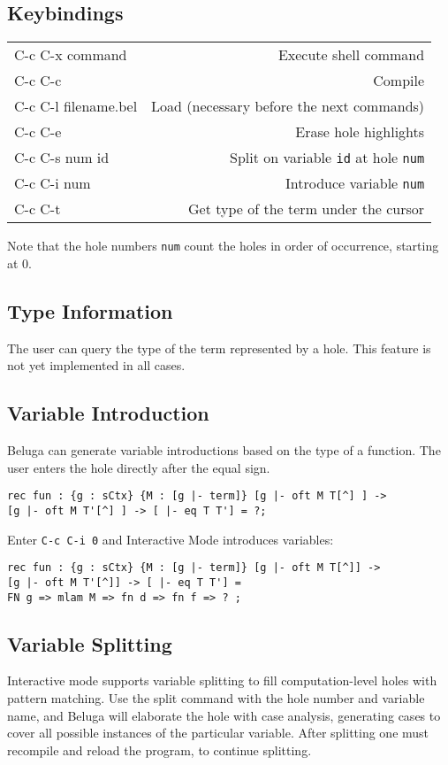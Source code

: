 \documentclass[11pt]{article}
\begin{document}
\subsection{Keybindings}

\begin{tabular}{ l r }
C-c C-x command & Execute shell command \\
C-c C-c & Compile \\
C-c C-l filename.bel & Load (necessary before the next commands) \\
C-c C-e & Erase hole highlights \\
C-c C-s num id & Split on variable \texttt{id} at hole \texttt{num} \\
C-c C-i num & Introduce variable \texttt{num} \\
C-c C-t & Get type of the term under the cursor \\
\end{tabular}

Note that the hole numbers \texttt{num} count the holes in order of occurrence, starting at 0.

\subsection{Type Information}
The user can query the type of the term represented by a hole. This feature is not yet implemented in all cases.

\subsection{Variable Introduction}
Beluga can generate variable introductions based on the type of a function. The user enters the hole directly after the equal sign.
\begin{verbatim}
rec fun : {g : sCtx} {M : [g |- term]} [g |- oft M T[^] ] ->
[g |- oft M T'[^] ] -> [ |- eq T T'] = ?;
\end{verbatim}

Enter \texttt{C-c C-i 0} and Interactive Mode introduces variables:
\begin{verbatim}
rec fun : {g : sCtx} {M : [g |- term]} [g |- oft M T[^]] ->
[g |- oft M T'[^]] -> [ |- eq T T'] =
FN g => mlam M => fn d => fn f => ? ;
\end{verbatim}


\subsection{Variable Splitting}
Interactive mode supports variable splitting to fill computation-level
holes with pattern matching. Use the split command with the hole
number and variable name, and Beluga will elaborate the hole with case
analysis, generating cases to cover all possible instances of the
particular variable. After splitting one must recompile and reload the
program, to continue splitting.
\end{document}
